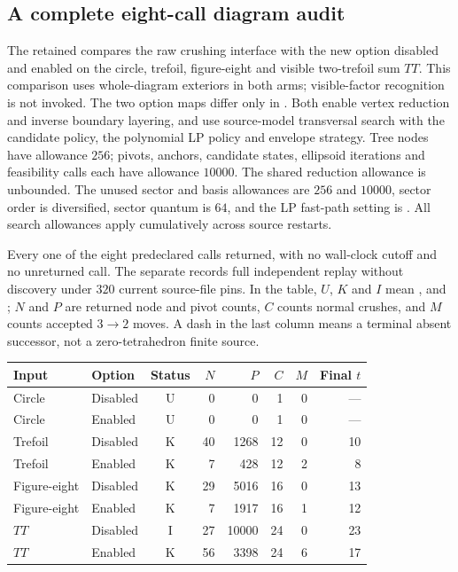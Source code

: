 \subsection{A complete eight-call diagram audit}
\label{sec:strict-pachner32-audit}

The retained  compares the raw
crushing interface with the new option disabled and enabled on the circle,
trefoil, figure-eight and visible two-trefoil sum $TT$.  This comparison
uses whole-diagram exteriors in both arms; visible-factor recognition is
not invoked.  The two option maps differ only in
.  Both enable vertex reduction and inverse
boundary layering, and use source-model transversal search with the
 candidate policy, the polynomial LP policy and envelope
strategy.  Tree nodes have allowance $256$; pivots, anchors, candidate
states, ellipsoid iterations and feasibility calls each have allowance
$10000$.  The shared reduction allowance is unbounded.  The unused
sector and basis allowances are $256$ and $10000$, sector order is
diversified, sector quantum is $64$, and the LP fast-path setting is
.  All search allowances apply cumulatively across source
restarts.

Every one of the eight predeclared calls returned, with no wall-clock
cutoff and no unreturned call.  The separate
 records full independent replay
without discovery under $320$ current source-file pins.  In the table,
$U$, $K$ and $I$ mean ,  and
; $N$ and $P$ are returned node and pivot counts,
$C$ counts normal crushes, and $M$ counts accepted $3\to2$ moves.
A dash in the last column means a terminal absent successor, not a
zero-tetrahedron finite source.

\begin{center}\small
\begin{tabular}{llcrrrrr}
\toprule
Input & Option & Status & $N$ & $P$ & $C$ & $M$ & Final $t$\\
\midrule
Circle & Disabled & U & 0 & 0 & 1 & 0 & ---\\
Circle & Enabled & U & 0 & 0 & 1 & 0 & ---\\
Trefoil & Disabled & K & 40 & 1268 & 12 & 0 & 10\\
Trefoil & Enabled & K & 7 & 428 & 12 & 2 & 8\\
Figure-eight & Disabled & K & 29 & 5016 & 16 & 0 & 13\\
Figure-eight & Enabled & K & 7 & 1917 & 16 & 1 & 12\\
$TT$ & Disabled & I & 27 & 10000 & 24 & 0 & 23\\
$TT$ & Enabled & K & 56 & 3398 & 24 & 6 & 17\\
\bottomrule
\end{tabular}
\end{center}

